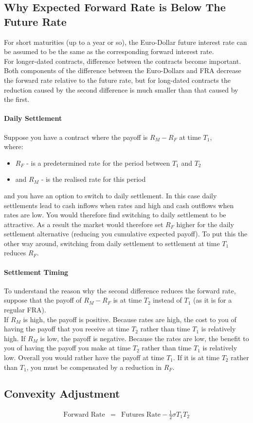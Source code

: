 \subsection{Why Expected Forward Rate is Below The Future Rate}
For short maturities (up to a year or so), the Euro-Dollar future interest rate can be assumed to be the same as the corresponding forward interest rate.\\
For longer-dated contracts, difference between the contracts become important.\\
Both components of the difference between the Euro-Dollars and FRA decrease the forward rate relative to the future rate, but for long-dated contracts the reduction caused by the second difference is much smaller than that caused by the first.

\paragraph{Daily Settlement}
Suppose you have a contract where the payoff is $R_{M} - R_{F}$ at time $T_{1}$,\\
where:
\begin{itemize}
	\item $R_{F}$ - is a predetermined rate for the period between $T_{1}$ and $T_{2}$
	\item and $R_{M}$ - is the realised rate for this period
\end{itemize}
and you have an option to switch to daily settlement. In this case daily settlements lead to cash inflows when rates and high and cash outflows when rates are low. You would therefore find switching to daily settlement to be attractive. As a result the market would therefore set $R_{F}$ higher for the daily settlement alternative (reducing you cumulative expected payoff). To put this the other way around, switching from daily settlement to settlement at time $T_{1}$ reduces $R_{F}$.

\paragraph{Settlement Timing}
To understand the reason why the second difference reduces the forward rate, suppose that the payoff of $R_{M} - R_{F}$ is at time $T_{2}$ instead of $T_{1}$ (as it is for a regular FRA).\\
If $R_{M}$ is high, the payoff is positive. Because rates are high, the cost to you of having the payoff that you receive at time $T_{2}$ rather than time $T_{1}$ is relatively high. If $R_{M}$ is low, 
the payoff is negative. Because the rates are low, the benefit to you of having the payoff you make at time $T_{2}$ rather than time $T_{1}$ is relatively low. Overall you would rather have the payoff at time $T_{1}$. If it is at time $T_{2}$ rather than $T_{1}$, you must be compensated by a reduction in $R_{F}$.

\subsection{Convexity Adjustment}
\begin{eqnarray}
	\text{Forward Rate} &=& \text{Futures Rate} - \frac{1}{2}\sigma T_{1} T_{2}
\end{eqnarray}